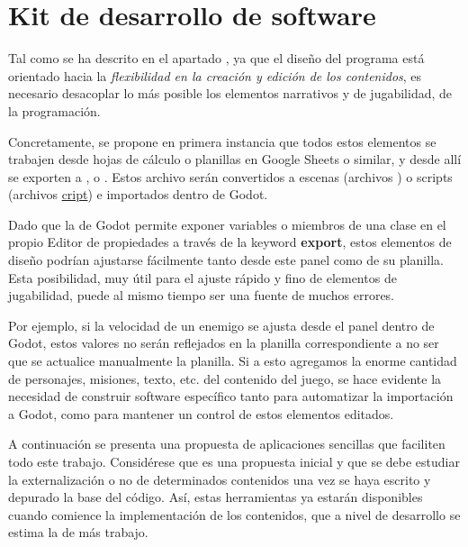 
\section{Kit de desarrollo de software}\label{kit:kit-de-desarrollo}

Tal como se ha descrito en el apartado , ya que el diseño del programa está orientado hacia la \emph{flexibilidad en la creación y edición de los contenidos}, es necesario desacoplar lo más posible los elementos narrativos y de jugabilidad, de la programación.

Concretamente, se propone en primera instancia que todos estos elementos se trabajen desde hojas de cálculo o planillas en Google Sheets o similar, y desde allí se exporten a ,  o . Estos archivo serán convertidos a escenas (archivos \href{https://docs.godotengine.org/es/stable/development/file_formats/tscn.html}{}) o scripts (archivos \href{https://docs.godotengine.org/es/stable/development/file_formats/gdscript_grammar.html}{cript}) e importados dentro de Godot.

Dado que la  de Godot permite exponer variables o miembros de una clase en el propio Editor de propiedades a través de la keyword \textbf{export}, estos elementos de diseño podrían ajustarse fácilmente tanto desde este panel como de su planilla. Esta posibilidad, muy útil para el ajuste rápido y fino de elementos de jugabilidad, puede al mismo tiempo ser una fuente de muchos errores.

Por ejemplo, si la velocidad de un enemigo se ajusta desde el panel dentro de Godot, estos valores no serán reflejados en la planilla correspondiente a no ser que se actualice manualmente la planilla. Si a esto agregamos la enorme cantidad de personajes, misiones, texto, etc. del contenido del juego, se hace evidente la necesidad de construir software específico tanto para automatizar la importación a Godot, como para mantener un control de estos elementos editados.

A continuación se presenta una propuesta de aplicaciones sencillas que faciliten todo este trabajo. Considérese que es una propuesta inicial y que se debe estudiar la externalización o no de determinados contenidos una vez se haya escrito y depurado la base del código. Así, estas herramientas ya estarán disponibles cuando comience la implementación de los contenidos, que a nivel de desarrollo se estima la de más trabajo.

